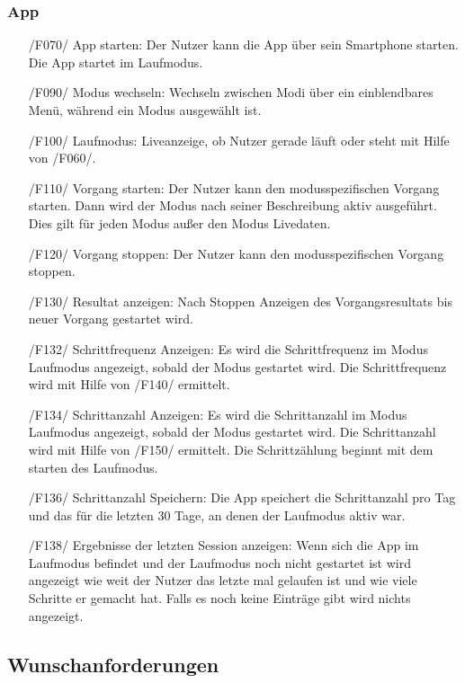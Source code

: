 \documentclass[a4paper,12pt]{article}
\begin{document}
    \subsubsection{App}
      \begin{itemize}
      \item[/F070/] \textsf{App starten:} Der Nutzer kann die App über sein Smartphone starten. Die App startet im Laufmodus.
      \item[/F090/] \textsf{Modus wechseln:} Wechseln zwischen Modi über ein einblendbares Menü, während ein Modus ausgewählt ist.
      \item[/F100/] \textsf{Laufmodus:} Liveanzeige, ob Nutzer gerade \glqq läuft\grqq{} oder \glqq steht\grqq{} mit Hilfe von /F060/.
      \item[/F110/] \textsf{Vorgang starten:} Der Nutzer kann den modusspezifischen \Gls{Vorgang} starten. Dann wird der Modus nach seiner Beschreibung aktiv ausgeführt. Dies gilt für jeden Modus außer den Modus \glqq Livedaten\grqq.
      \item[/F120/] \textsf{Vorgang stoppen:} Der Nutzer kann den modusspezifischen \Gls{Vorgang} stoppen.
      \item[/F130/] \textsf{Resultat anzeigen:} Nach Stoppen Anzeigen des Vorgangsresultats bis neuer \Gls{Vorgang} gestartet wird.
      \item[/F132/] \textsf {Schrittfrequenz Anzeigen:} Es wird die Schrittfrequenz im Modus \glqq{}Laufmodus\grqq{} angezeigt, sobald der Modus gestartet wird. Die Schrittfrequenz wird mit Hilfe von /F140/ ermittelt.
      \item[/F134/] \textsf {Schrittanzahl Anzeigen:} Es wird die Schrittanzahl im Modus \glqq{}Laufmodus\grqq{} angezeigt, sobald der Modus gestartet wird. Die Schrittanzahl wird mit Hilfe von /F150/ ermittelt. Die Schrittzählung beginnt mit dem starten des Laufmodus.
      \item[/F136/] \textsf{Schrittanzahl Speichern:} Die App speichert die Schrittanzahl pro Tag und das für die letzten 30 Tage, an denen der Laufmodus aktiv war.
      \item[/F138/] \textsf{Ergebnisse der letzten Session anzeigen:} Wenn sich die App im Laufmodus befindet und der Laufmodus noch nicht gestartet ist wird angezeigt wie weit der Nutzer das letzte mal gelaufen ist und wie viele Schritte er gemacht hat. Falls es noch keine Einträge gibt wird nichts angezeigt.
    \end{itemize}
  \subsection{Wunschanforderungen}
\end{document}
